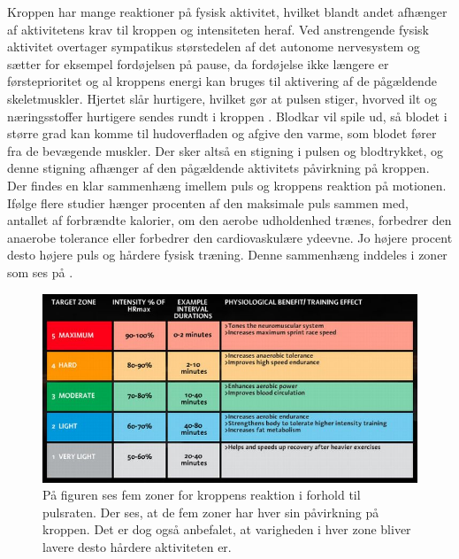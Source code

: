 Kroppen har mange reaktioner på fysisk aktivitet, hvilket blandt andet afhænger af aktivitetens krav til kroppen og intensiteten heraf. Ved anstrengende fysisk aktivitet overtager sympatikus størstedelen af det autonome nervesystem og sætter for eksempel fordøjelsen på pause, da fordøjelse ikke længere er førsteprioritet og al kroppens energi kan bruges til aktivering af de pågældende skeletmuskler. Hjertet slår hurtigere, hvilket gør at pulsen stiger, hvorved ilt og næringsstoffer hurtigere sendes rundt i kroppen \citep{Hjerteforeningen}. Blodkar vil spile ud, så blodet i større grad kan komme til hudoverfladen og afgive den varme, som blodet fører fra de bevægende muskler. Der sker altså en stigning i pulsen og blodtrykket, og denne stigning afhænger af den pågældende aktivitets påvirkning på kroppen. \citep{Martini2012,Stanfield2013,Berchtold2010} \\
Der findes en klar sammenhæng imellem puls og kroppens reaktion på motionen. Ifølge flere studier hænger procenten af den maksimale puls sammen med, antallet af forbrændte kalorier, om den aerobe udholdenhed trænes, forbedrer den anaerobe tolerance eller forbedrer den cardiovaskulære ydeevne. Jo højere procent desto højere puls og hårdere fysisk træning. Denne sammenhæng inddeles i zoner som ses på . \citep{Leyland2007,Heartratejournal2015}
\begin{figure}[H]
	\centering
	\includegraphics[scale=0.75]{figures/aProblemanalyse/heart-rate-zones.jpg}
	\caption{På figuren ses fem zoner for kroppens reaktion i forhold til pulsraten. Der ses, at de fem zoner har hver sin påvirkning på kroppen. Det er dog også anbefalet, at varigheden i hver zone bliver lavere desto hårdere aktiviteten er. \citep{Heartratejournal2015}}
	\label{fig:PA_Procentpuls}
\end{figure}


